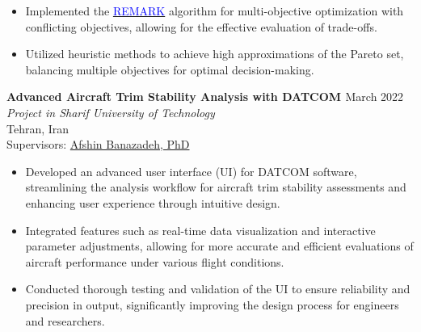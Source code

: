 \documentclass[12pt]{article}
\begin{document}
\begin{itemize} \itemsep -1pt %
    \item Implemented the \href{https://link.springer.com/article/10.1007/s12652-022-04332-8}{\textcolor{blue}{REMARK}} algorithm for multi-objective optimization with conflicting objectives, allowing for the effective evaluation of trade-offs.
    \item Utilized heuristic methods to achieve high approximations of the Pareto set, balancing multiple objectives for optimal decision-making.
\end{itemize}


\noindent
{\bfseries Advanced Aircraft Trim Stability Analysis with DATCOM
\href{https://github.com/alibaniasad1999/DATCOM-Trim-Diagram-GUI}{\faGithub}
}
\hfill March 2022 \\ 
\noindent \textit{Project in Sharif University of Technology} \\ \hfill Tehran, Iran \\ 
\noindent Supervisors: 
\href{http://ae.sharif.edu/~portal/faculty/1014037799}{Afshin Banazadeh, PhD} 
\begin{itemize} \itemsep -1pt %
    \item Developed an advanced user interface (UI) for DATCOM software, streamlining the analysis workflow for aircraft trim stability assessments and enhancing user experience through intuitive design.
    \item Integrated features such as real-time data visualization and interactive parameter adjustments, allowing for more accurate and efficient evaluations of aircraft performance under various flight conditions.
    \item Conducted thorough testing and validation of the UI to ensure reliability and precision in output, significantly improving the design process for engineers and researchers.
\end{itemize}
\end{document}
